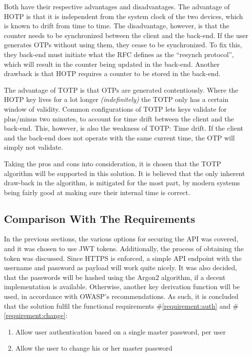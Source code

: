 				Both have their respective advantages and disadvantages. The advantage of HOTP is that it is independent from the system clock of the two devices, which is known to drift from time to time. The disadvantage, however, is that the counter needs to be synchronized between the client and the back-end. If the user generates OTPs without using them, they cease to be synchronized. To fix this, they back-end must initiate what the RFC defines as the ``resynch protocol'', which will result in the counter being updated in the back-end. Another drawback is that HOTP requires a counter to be stored in the back-end.

				The advantage of TOTP is that OTPs are generated contentiously. Where the HOTP key lives for a lot longer \emph{(indefinitely)} the TOTP only has a certain window of validity. Common configurations of TOTP lets keys validate for plus/minus two minutes, to account for time drift between the client and the back-end. This, however, is also the weakness of TOTP: Time drift. If the client and the back-end does not operate with the same current time, the OTP will simply not validate.

				Taking the pros and cons into consideration, it is chosen that the TOTP algorithm will be supported in this solution. It is believed that the only inherent draw-back in the algorithm, is mitigated for the most part, by modern systems being fairly good at making sure their internal time is correct.

		\subsection{Comparison With The Requirements}
			\label{requirement:fulfilled:auth}
			\label{requirement:fulfilled:change}
			\label{requirement:fulfilled:two-factor}
			In the previous sections, the various options for securing the API was covered, and it was chosen to use JWT tokens. Additionally, the process of obtaining the token was discussed. Since HTTPS is enforced, a simple API endpoint with the username and password as payload will work quite nicely. It was also decided, that the passwords will be hashed using the Argon2 algorithm, if a decent implementation is available. Otherwise, another key derivation function will be used, in accordance with OWASP's recommendations. As such, it is concluded that the solution fulfil the functional requirements \#\ref{requirement:auth} and \#\ref{requirement:change}:

			\vspace{-3ex}\begin{enumerate}
				\setlength\itemsep{0.1em}
				\setcounter{enumi}{14-1}
				\item Allow user authentication based on a single master password, per user
				\item Allow the user to change his or her master password
			\end{enumerate}

